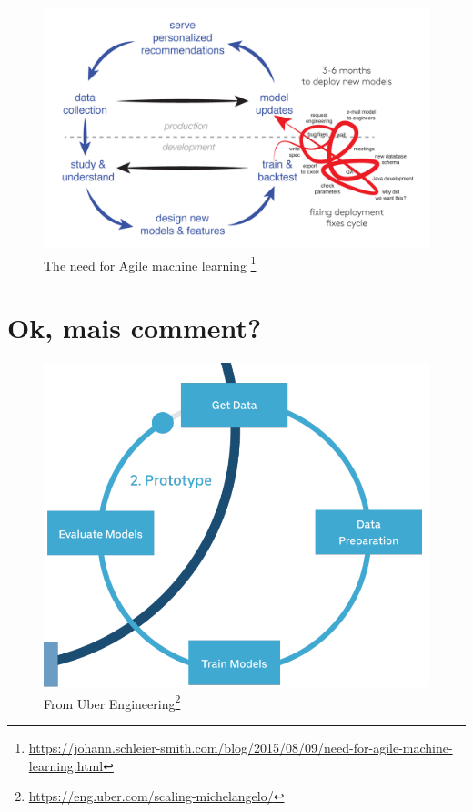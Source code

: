\documentclass{beamer}
\begin{document}
	\begin{frame}
		\begin{figure}
			\centering
			\includegraphics[scale=0.15]{cycle-white.png}
			\caption{The need for Agile machine learning \footnote{\url{https://johann.schleier-smith.com/blog/2015/08/09/need-for-agile-machine-learning.html}}}
		\end{figure}
	\end{frame}
	
	\section{Ok, mais comment?}
	
	\begin{frame}
		\begin{figure}
			\centering
			\includegraphics[scale=0.25]{cycle-2.png}
			\caption{From Uber Engineering\footnote{\url{https://eng.uber.com/scaling-michelangelo/}}}
		\end{figure}
	\end{frame}
\end{document}
